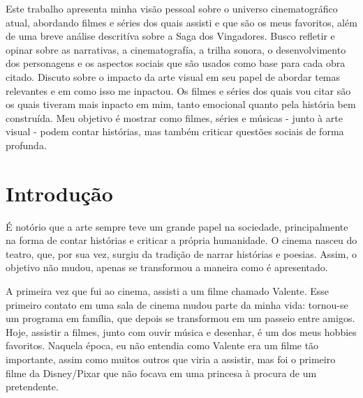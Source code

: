 \documentclass[
    12pt,                  %
    openright,             %
    oneside,               %
    a4paper,               %
    chapter=TITLE,         %
    section=TITLE,         %
    brazil                 %
]{abntex2}                 %
\begin{document}
\imprimircapa

\imprimirfolhaderosto

\begin{resumo}
Este trabalho apresenta minha visão pessoal sobre o universo cinematográfico atual, abordando filmes e séries dos quais assisti e que são os meus favoritos, além de uma breve análise descritíva sobre a Saga dos Vingadores. Busco refletir e opinar sobre as narrativas, a cinematografía, a trilha sonora, o desenvolvimento dos personagens e os aspectos sociais que são usados como base para cada obra citado. Discuto sobre o impacto da arte visual em seu papel de abordar temas relevantes e em como isso me inpactou. Os filmes e séries dos quais vou citar são os quais tiveram mais inpacto em mim, tanto emocional quanto pela história bem construída. Meu objetivo é mostrar como filmes, séries e músicas - junto à arte visual - podem contar histórias, mas também criticar questões sociais de forma profunda.
 \end{resumo}   

\tableofcontents



\chapter*{Introdução}
É notório que a arte sempre teve um grande papel na sociedade, principalmente na forma de contar histórias e criticar a própria humanidade. O cinema nasceu do teatro, que, por sua vez, surgiu da tradição de narrar histórias e poesias. Assim, o objetivo não mudou, apenas se transformou a maneira como é apresentado.\\ \vspace{0.1px}

\noindent A primeira vez que fui ao cinema, assisti a um filme chamado Valente. Esse primeiro contato em uma sala de cinema mudou parte da minha vida: tornou-se um programa em família, que depois se transformou em um passeio entre amigos. Hoje, assistir a filmes, junto com ouvir música e desenhar, é um dos meus hobbies favoritos. Naquela época, eu não entendia como Valente era um filme tão importante, assim como muitos outros que viria a assistir, mas foi o primeiro filme da Disney/Pixar que não focava em uma princesa à procura de um pretendente.\\ \vspace{0.1px}
\end{document}
